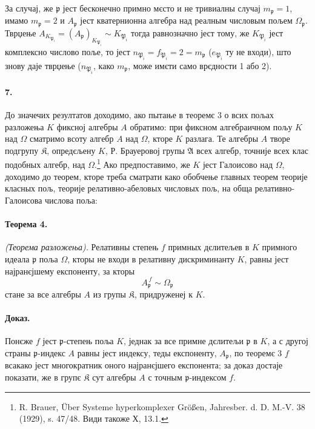 \documentclass[11pt]{article}
\newcommand{\foreign}[1]{#1}
\begin{document}
За случај, же \(\mathfrak p\) јест бесконечно примно мєсто и не тривиалны случај \(m_{\mathfrak p}=1\), имамо \(m_{\mathfrak p}=2\) и \(A_{\mathfrak p}\) јест кватернионна алгебра над реалным числовым пољем \(\Omega_{\mathfrak p}\). Тврџење \(A_{K_{\mathfrak P_i}}=(A_{\mathfrak p})_{K_{\mathfrak P_i}}\sim K_{\mathfrak P_i}\) тогда равнозначно јест тому, же \(K_{\mathfrak P_i}\) јест комплексно числово поље, то јест \(n_{\mathfrak P_i}=f_{\mathfrak P_i}=2=m_{\mathfrak p}\) (\(e_{\mathfrak P_i}\) ту не входи), што знову даје тврџење (\(n_{\mathfrak P_i}\), како \(m_{\mathfrak p}\), може имєти само врєдности 1 або 2).

\paragraph{7.}
До значечих резултатов доходимо, ако пытање в теоремє 3 о всих пољах разложења \(K\) фиксној алгебры \(A\) обратимо: при фиксном алгебраичном пољу \(K\) над \(\Omega\) сматримо всоту алгебр \(A\) над \(\Omega\), кторе \(K\) разлага. Те алгебры \(A\) творе подгрупу \(\mathfrak K\), опредєљену \(K\), Р. Брауеровој групы \(\mathfrak A\) всех алгебр, точније всех клас подобных алгебр, над \(\Omega\).\footnote{\foreign{R. Brauer, Über Systeme hyperkomplexer Größen, Jahresber. d. D. M.-V. 38 (1929), s. 47/48.} Види такоже Х, 13.1.} Ако предпоставимо, же \(K\) јест Галоисово над \(\Omega\), доходимо до теорем, кторе треба сматрати како обобчење главных теорем теорије класных пољ, теорије релативно-абеловых числовых пољ, на обща релативно-Галоисова числова поља:

\paragraph{Теорема 4.}
\emph{(Теорема разложења).} Релативны степењ \(f\) примных дєлитељев в \(K\) примного идеала \(\mathfrak p\) поља \(\Omega\), кторы не входи в релативну дискриминанту \(K\), равны јест најранєјшему експоненту, за кторы
\[
        A_{\mathfrak p}^{\,f}\sim\Omega_{\mathfrak p}
\]
стане за все алгебры \(A\) из групы \(\mathfrak K\), придруженеј к \(K\).

\paragraph{Доказ.}
Понєже \(f\) јест \( \mathfrak p\)-степењ поља \(K\), једнак за все примне дєлитељи \(\mathfrak p\) в \(K\), а с другој страны \( \mathfrak p\)-индекс \(A\) равны јест индексу, теды експоненту, \(A_{\mathfrak p}\), по теоремє 3 \(f\) всакако јест многократник оного најранєјшего експонента; за доказ достаје показати, же в групє \(\mathfrak K\) сут алгебры \(A\) с точным \( \mathfrak p\)-индексом \(f\).
\end{document}
